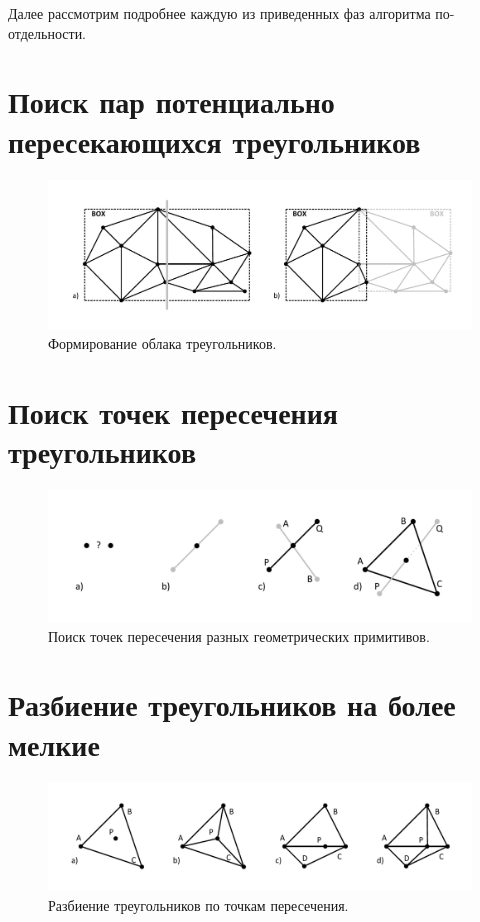 \documentclass[
11pt,%
tightenlines,%
twoside,%
onecolumn,%
nofloats,%
nobibnotes,%
nofootinbib,%
superscriptaddress,%
noshowpacs,%
centertags]%
{revtex4}
\begin{document}
Далее рассмотрим подробнее каждую из приведенных фаз алгоритма по-отдельности.

\section{Поиск пар потенциально пересекающихся треугольников}

\begin{figure}[h]
\includegraphics[width=1.0\textwidth]{pics/pic_triangles_cloud_s.pdf}
\caption{Формирование облака треугольников.}\label{fig:pic_triangles_cloud_s}
\end{figure}

\section{Поиск точек пересечения треугольников}

\begin{figure}[h]
\includegraphics[width=1.0\textwidth]{pics/pic_intersection_s.pdf}
\caption{Поиск точек пересечения разных геометрических примитивов.}\label{fig:pic_intersection_s}
\end{figure}

\section{Разбиение треугольников на более мелкие}

\begin{figure}[h]
\includegraphics[width=1.0\textwidth]{pics/pic_split_s.pdf}
\caption{Разбиение треугольников по точкам пересечения.}\label{fig:pic_split_s}
\end{figure}
\end{document}
